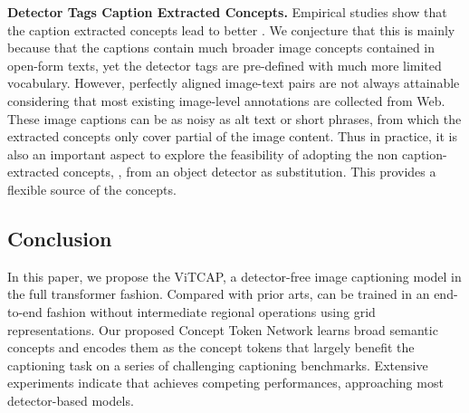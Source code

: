 \vspace{1mm}
\noindent\textbf{Detector Tags \vs Caption Extracted Concepts.} Empirical studies show that the caption extracted concepts lead to better \vitcap\!. We conjecture that this is mainly because that the captions contain much broader image concepts contained in open-form texts, yet the detector tags are pre-defined with much more limited vocabulary. However, perfectly aligned image-text pairs are not always attainable considering that most existing image-level annotations are collected from Web. These image captions can be as noisy as alt text or short phrases, from which the extracted concepts only cover partial of the image content. Thus in practice, it is also an important aspect to explore the feasibility of adopting the non caption-extracted concepts, \eg, from an object detector as substitution. This provides a flexible source of the concepts. 




\subsection{Conclusion}
In this paper, we propose the ViTCAP, a detector-free image captioning model in the full transformer fashion. Compared with prior arts, \vitcap can be trained in an end-to-end fashion without intermediate regional operations using grid representations. Our proposed Concept Token Network learns broad semantic concepts and encodes them as the concept tokens that largely benefit the captioning task on a series of challenging captioning benchmarks. Extensive experiments indicate that \vitcap achieves competing performances, approaching most detector-based models. 

\vspace{-2mm}
